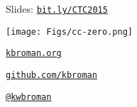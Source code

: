 \documentclass[12pt,t]{beamer}
\begin{document}
\begin{frame}[c]{}

\Large

Slides: \href{http://bit.ly/CTC2015}{\tt bit.ly/CTC2015}

\vspace*{-7mm}
\hspace{70mm} \texttt{[image: Figs/cc-zero.png]}

\vspace{10mm}

\href{http://kbroman.org}{\tt kbroman.org}

\vspace{10mm}

\href{https://github.com/kbroman}{\tt github.com/kbroman}

\vspace{10mm}

\href{https://twitter.com/kwbroman}{\tt @kwbroman}


\end{frame}
\end{document}
